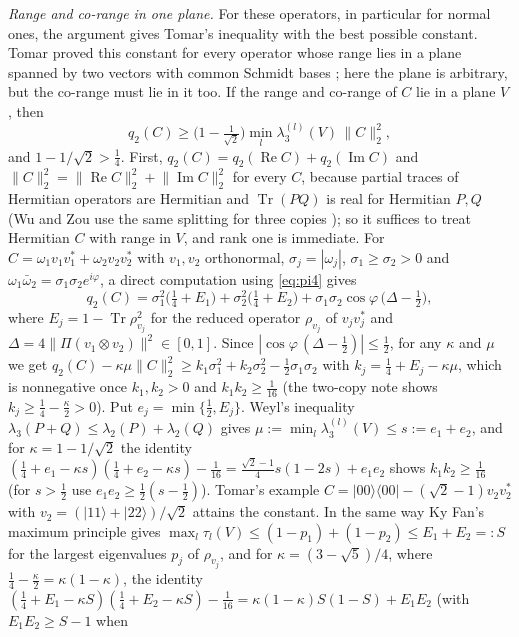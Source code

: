 \documentclass[11pt]{article}
\theoremstyle{remark}
\newcommand{\Tr}{\operatorname{Tr}}
\newcommand{\norm}[1]{\lVert #1\rVert}
\begin{document}
\emph{Range and co-range in one plane.} For these operators, in particular for normal ones, the argument gives Tomar's
inequality with the best possible constant. Tomar proved this constant for every operator whose range lies in a plane
spanned by two vectors with common Schmidt bases \cite[Thm.~7.2]{Tomar2}; here the plane is arbitrary, but the
co-range must lie in it too. If the range and co-range of $C$ lie in a plane $V$, then
\[
q_2(C)\ge\big(1-\tfrac1{\sqrt2}\big)\min_l\lambda_3^{(l)}(V)\,\norm{C}_2^2 ,
\]
and $1-1/\sqrt2>\frac14$. First, $q_2(C)=q_2(\operatorname{Re}C)+q_2(\operatorname{Im}C)$ and
$\norm{C}_2^2=\norm{\operatorname{Re}C}_2^2+\norm{\operatorname{Im}C}_2^2$ for every $C$, because partial traces of
Hermitian operators are Hermitian and $\Tr(PQ)$ is real for Hermitian $P,Q$ (Wu and Zou use the same splitting for
three copies \cite[Cor.~6.2]{WuZou}); so it suffices to treat Hermitian $C$ with range in $V$, and rank one is
immediate. For $C=\omega_1v_1v_1^*+\omega_2v_2v_2^*$ with $v_1,v_2$ orthonormal,
$\sigma_j=|\omega_j|$, $\sigma_1\ge\sigma_2>0$ and $\omega_1\bar\omega_2=\sigma_1\sigma_2e^{i\varphi}$, a direct
computation using \eqref{eq:pi4} gives
\[
q_2(C)=\sigma_1^2\big(\tfrac14+E_1\big)+\sigma_2^2\big(\tfrac14+E_2\big)+\sigma_1\sigma_2\cos\varphi\,\big(\Delta-\tfrac12\big),
\]
where $E_j=1-\Tr\rho_{v_j}^2$ for the reduced operator $\rho_{v_j}$ of $v_jv_j^*$ and
$\Delta=4\norm{\Pi(v_1\otimes v_2)}^2\in[0,1]$. Since $|\cos\varphi\,(\Delta-\frac12)|\le\frac12$, for any $\kappa$
and $\mu$ we get $q_2(C)-\kappa\mu\norm{C}_2^2\ge k_1\sigma_1^2+k_2\sigma_2^2-\frac12\sigma_1\sigma_2$ with
$k_j=\frac14+E_j-\kappa\mu$, which is nonnegative once $k_1,k_2>0$ and $k_1k_2\ge\frac1{16}$ (the two-copy note shows $k_j\ge\frac14-\frac\kappa2>0$). Put
$e_j=\min\{\frac12,E_j\}$. Weyl's inequality $\lambda_3(P+Q)\le\lambda_2(P)+\lambda_2(Q)$ gives
$\mu:=\min_l\lambda_3^{(l)}(V)\le s:=e_1+e_2$, and for $\kappa=1-1/\sqrt2$ the identity
$(\frac14+e_1-\kappa s)(\frac14+e_2-\kappa s)-\frac1{16}=\frac{\sqrt2-1}4s(1-2s)+e_1e_2$ shows $k_1k_2\ge\frac1{16}$
(for $s>\frac12$ use $e_1e_2\ge\frac12(s-\frac12)$). Tomar's example $C=|00\rangle\langle00|-(\sqrt2-1)v_2v_2^*$ with
$v_2=(|11\rangle+|22\rangle)/\sqrt2$ attains the constant. In the same way Ky Fan's maximum principle gives
$\max_l\tau_l(V)\le(1-p_1)+(1-p_2)\le E_1+E_2=:S$ for the largest eigenvalues $p_j$ of $\rho_{v_j}$, and for
$\kappa=(3-\sqrt5)/4$, where $\frac14-\frac\kappa2=\kappa(1-\kappa)$, the identity
$(\frac14+E_1-\kappa S)(\frac14+E_2-\kappa S)-\frac1{16}=\kappa(1-\kappa)S(1-S)+E_1E_2$ (with $E_1E_2\ge S-1$ when
\end{document}
